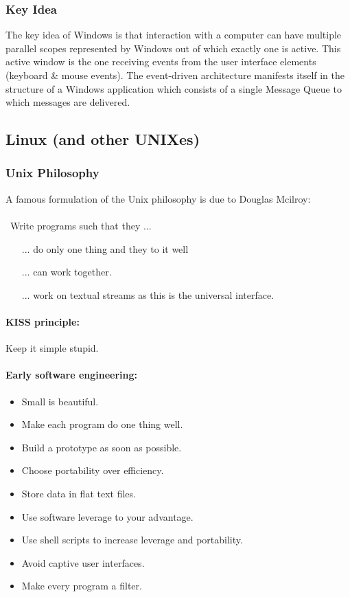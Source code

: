\documentclass[twocolumn]{article}
\begin{document}
		\subsubsection{Key Idea}
			The key idea of Windows is that interaction with a computer can have multiple parallel scopes represented by Windows out of which exactly one is active. This active window is the one receiving events from the user interface elements (keyboard \& mouse events). The event-driven architecture manifests itself in the structure of a Windows application which consists of a single Message Queue to which messages are delivered.
	\subsection{Linux (and other UNIXes)}
		\subsubsection{Unix Philosophy}
			A famous formulation of the Unix philosophy is due to Douglas Mcilroy:\\\\\
			Write programs such that they ...
			\begin{itemize}
				\item[...]  do only one thing and they to it well
				\item[...]  can work together.
				\item[...]  work on textual streams as this is the universal interface.
			\end{itemize}
			\paragraph{KISS principle:}
				Keep it simple stupid.
			\paragraph{Early software engineering:}
				\begin{itemize}
				\item Small is beautiful.
				\item Make each program do one thing well.
				\item Build a prototype as soon as possible.
				\item Choose portability over efficiency.
				\item Store data in flat text files.
				\item Use software leverage to your advantage.
				\item Use shell scripts to increase leverage and portability.
				\item Avoid captive user interfaces.
				\item Make every program a filter.
				\end{itemize}
\end{document}
